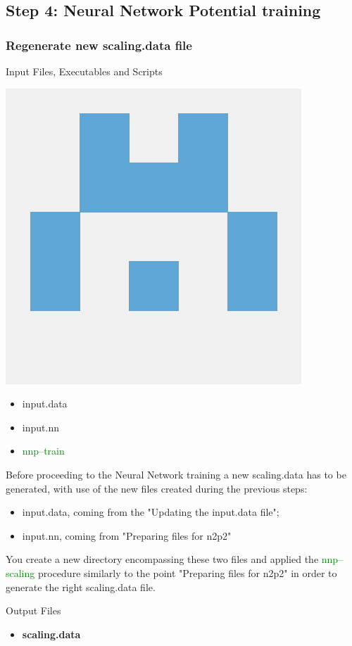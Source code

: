 \documentclass[12pt]{article}
\begin{document}
\subsection{Step 4: Neural Network Potential training}
\subsubsection{Regenerate new scaling.data file}
\begin{mybox2}{{Input Files, Executables and Scripts}}
\begin{minipage}[c]{0.5\linewidth}
\includegraphics[scale=0.1]{n2p2.png}
\end{minipage}
\begin{minipage}[c]{0.5\linewidth}
\begin{itemize}
    \item input.data
    \item input.nn
    \item \textcolor{green}{nnp--train}
\end{itemize}
\end{minipage}
\end{mybox2}
Before proceeding to the Neural Network training a new scaling.data has to be generated, with use of the new files created during the previous steps:
\begin{itemize}
    \item input.data, coming from the "Updating the input.data file";
    \item input.nn, coming from "Preparing files for n2p2"
\end{itemize}
You create a new directory encompassing these two files and applied the \textcolor{green}{nnp--scaling} procedure similarly to the point "Preparing files for n2p2" in order to generate the right scaling.data file. 
\\
\begin{mybox3}{Output Files}
\begin{itemize}
    \item \textbf{scaling.data}
\end{itemize}
\end{mybox3}
%
\end{document}
